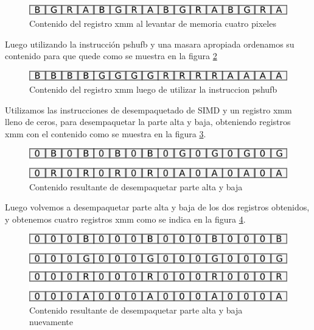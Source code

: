 \documentclass[a4paper]{article}
\begin{document}
\begin{figure}[H]
\centering
\includegraphics[scale=0.8]{imagenes/primerXmm.png}
\caption{Contenido del registro xmm al levantar de memoria cuatro pixeles}
\label{primerXmm}
\end{figure}

Luego utilizando la instrucción pshufb y una masara apropiada ordenamos su contenido para que quede como se muestra en la figura \ref{segundoXmm}

\begin{figure}[H]
\centering
\includegraphics[scale=0.8]{imagenes/segundoXmm.png}
\caption{Contenido del registro xmm luego de utilizar la instruccion pshufb}
\label{segundoXmm}
\end{figure}

Utilizamos las instrucciones de desempaquetado de SIMD y un registro xmm lleno de ceros, para desempaquetar la parte alta y baja, obteniendo registros xmm con el contenido como se muestra en la figura \ref{tercerXmm}.


\begin{figure}[H]
\centering
\includegraphics[scale=0.8]{imagenes/tecerXmm.png}
\caption{Contenido resultante de desempaquetar parte alta y baja}
\label{tercerXmm}
\end{figure}

Luego volvemos a desempaquetar parte alta y baja de los dos registros obtenidos, y obtenemos cuatro registros xmm como se indica en la figura \ref{cuartoXmm}.


\begin{figure}[H]
\centering
\includegraphics[scale=0.8]{imagenes/cuartoXmm.png}
\caption{Contenido resultante de desempaquetar parte alta y baja nuevamente}
\label{cuartoXmm}
\end{figure}
\end{document}
